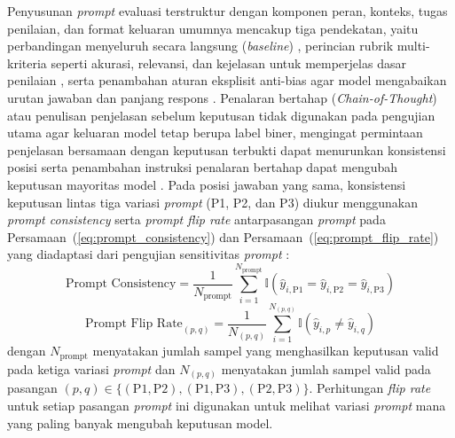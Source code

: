 Penyusunan \textit{prompt} evaluasi terstruktur dengan komponen peran, konteks, tugas penilaian, dan format keluaran umumnya mencakup tiga pendekatan, yaitu perbandingan menyeluruh secara langsung (\textit{baseline}) \cite{zhengJudgingLLMasaJudgeMTBench2023}\cite{guSurveyLLMasaJudge2025}, perincian rubrik multi-kriteria seperti akurasi, relevansi, dan kejelasan untuk memperjelas dasar penilaian \cite{guSurveyLLMasaJudge2025}\cite{liLLMsasJudgesComprehensiveSurvey2024}, serta penambahan aturan eksplisit anti-bias agar model mengabaikan urutan jawaban \cite{zhengJudgingLLMasaJudgeMTBench2023}\cite{anghelDiagnosingBiasInstability2025} dan panjang respons \cite{zhengJudgingLLMasaJudgeMTBench2023}. Penalaran bertahap (\textit{Chain-of-Thought}) atau penulisan penjelasan sebelum keputusan tidak digunakan pada pengujian utama agar keluaran model tetap berupa label biner, mengingat permintaan penjelasan bersamaan dengan keputusan terbukti dapat menurunkan konsistensi posisi \cite{guSurveyLLMasaJudge2025} serta penambahan instruksi penalaran bertahap dapat mengubah keputusan mayoritas model \cite{yagubyanCoinFlipJudge2026}. Pada posisi jawaban yang sama, konsistensi keputusan lintas tiga variasi \textit{prompt} (P1, P2, dan P3) diukur menggunakan \textit{prompt consistency} serta \textit{prompt flip rate} antarpasangan \textit{prompt} pada Persamaan~(\ref{eq:prompt_consistency}) dan Persamaan~(\ref{eq:prompt_flip_rate}) yang diadaptasi dari pengujian sensitivitas \textit{prompt} \cite{bellibatluJudgeSenseBenchmarkPrompt2026}\cite{yagubyanCoinFlipJudge2026}:
\begin{equation}
  \text{Prompt Consistency} = \frac{1}{N_{\text{prompt}}} \sum_{i=1}^{N_{\text{prompt}}} \mathbb{I}\left(\hat{y}_{i,\text{P1}} = \hat{y}_{i,\text{P2}} = \hat{y}_{i,\text{P3}}\right)
  \label{eq:prompt_consistency}
\end{equation}
\begin{equation}
  \text{Prompt Flip Rate}_{(p,q)} = \frac{1}{N_{(p,q)}} \sum_{i=1}^{N_{(p,q)}} \mathbb{I}\left(\hat{y}_{i,p} \neq \hat{y}_{i,q}\right)
  \label{eq:prompt_flip_rate}
\end{equation}
dengan $N_{\text{prompt}}$ menyatakan jumlah sampel yang menghasilkan keputusan valid pada ketiga variasi \textit{prompt} dan $N_{(p,q)}$ menyatakan jumlah sampel valid pada pasangan $(p,q) \in \{(\text{P1},\text{P2}), (\text{P1},\text{P3}), (\text{P2},\text{P3})\}$. Perhitungan \textit{flip rate} untuk setiap pasangan \textit{prompt} ini digunakan untuk melihat variasi \textit{prompt} mana yang paling banyak mengubah keputusan model.

